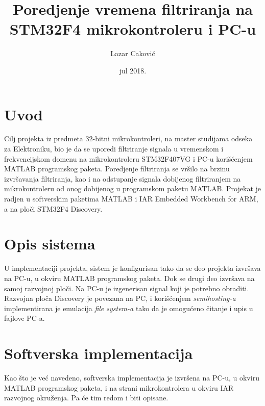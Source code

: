 \documentclass[a4paper,12pt, projekat]{etf}
\title{Poredjenje vremena filtriranja na STM32F4 mikrokontroleru i PC-u}
\author{Lazar Caković}
\date{jul 2018.}
\begin{document}
\maketitle

\tableofcontents

\listoffigures

\newpage

\chapter{Uvod}
Cilj projekta iz predmeta 32-bitni mikrokontroleri, na master studijama odseka
za Elektroniku, bio je da se uporedi filtriranje signala u vremenskom i frekvencijskom
domenu na mikrokontroleru STM32F407VG i PC-u kori\v{s}\'{c}enjem MATLAB programskog paketa.
Poredjenje filtriranja se vr\v{s}ilo na brzinu izvr\v{s}avanja filtriranja, kao i na
odstupanje signala dobijenog filtriranjem na mikrokontroleru od onog dobijenog u programskom
paketu MATLAB. Projekat je radjen u softverskim paketima MATLAB i IAR Embedded Workbench for ARM,
a na plo\v{c}i STM32F4 Discovery.

\newpage

\chapter{Opis sistema}
U implementaciji projekta, sistem je konfigurisan tako da se deo projekta izvr\v{s}ava na PC-u,
u okviru MATLAB programskog paketa. Dok se drugi deo izvr\v{s}ava na samoj razvojnoj plo\v{c}i.
Na PC-u je izgenerisan signal koji je potrebno obraditi. Razvojna plo\v{c}a Discovery je povezana
na PC, i kori\v{s}\'{c}enjem \textit{semihosting-a} implementirana je emulacija \textit{file system-a}
tako da je omogu\'{c}eno \v{c}itanje i upis u fajlove PC-a.

\newpage

\chapter{Softverska implementacija}
Kao \v{s}to je ve\'{c} navedeno, softverska implementacija je izvr\v{s}ena na PC-u, u okviru MATLAB
programskog paketa, i na strani mikrokontrolera u okviru IAR razvojnog okru\v{z}enja. Pa \'{c}e tim
redom i biti opisane.
\end{document}
